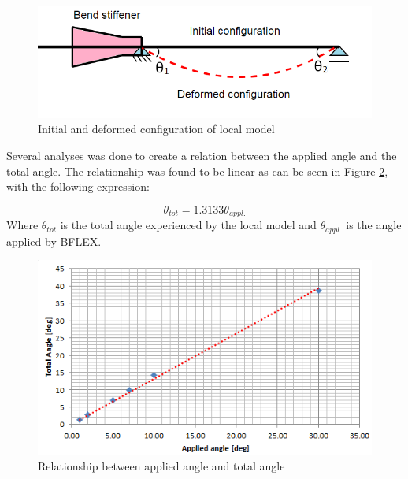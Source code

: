 \begin{figure}[H]
\centering
\includegraphics[scale=0.8]{figures/anglecorr}
\caption[Initial and deformed configuration of local model]{Initial and deformed configuration of local model}
 \label{fig:anglecorr}
\end{figure}

\noindent Several analyses was done to create a relation between the applied angle and the total angle. The relationship was found to be linear as can be seen in Figure \ref{fig:anglerel}, with the following expression:

\begin{equation}
    \theta_{tot}=1.3133\theta_{appl.}
\end{equation}
Where $\theta_{tot}$ is the total angle experienced by the local model and $\theta_{appl.}$ is the angle applied by BFLEX.
\begin{figure}[H]
\centering
\includegraphics[scale=0.8]{figures/anglerel}
\caption[Relationship between applied angle and total angle]{Relationship between applied angle and total angle}
 \label{fig:anglerel}
\end{figure}


